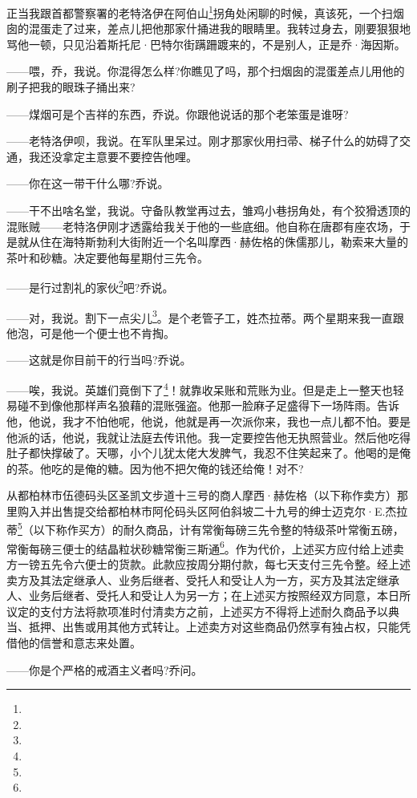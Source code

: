 \par 正当我跟首都警察署的老特洛伊在阿伯山\footnote{}拐角处闲聊的时候，真该死，一个扫烟囱的混蛋走了过来，差点儿把他那家什捅进我的眼睛里。我转过身去，刚要狠狠地骂他一顿，只见沿着斯托尼·巴特尔街蹒跚踱来的，不是别人，正是乔·海因斯。
\par ——喂，乔，我说。你混得怎么样?你瞧见了吗，那个扫烟囱的混蛋差点儿用他的刷子把我的眼珠子捅出来?
\par ——煤烟可是个吉祥的东西，乔说。你跟他说话的那个老笨蛋是谁呀?
\par ——老特洛伊呗，我说。在军队里呆过。刚才那家伙用扫帚、梯子什么的妨碍了交通，我还没拿定主意要不要控告他哩。
\par ——你在这一带干什么哪?乔说。
\par ——干不出啥名堂，我说。守备队教堂再过去，雏鸡小巷拐角处，有个狡猾透顶的混账贼——老特洛伊刚才透露给我关于他的一些底细。他自称在唐郡有座农场，于是就从住在海特斯勃利大街附近一个名叫摩西·赫佐格的侏儒那儿，勒索来大量的茶叶和砂糖。决定要他每星期付三先令。
\par ——是行过割礼的家伙\footnote{}吧?乔说。
\par ——对，我说。割下一点尖儿\footnote{}。是个老管子工，姓杰拉蒂。两个星期来我一直跟他泡，可是他一个便士也不肯掏。
\par ——这就是你目前干的行当吗?乔说。
\par ——唉，我说。英雄们竟倒下了\footnote{}！就靠收呆账和荒账为业。但是走上一整天也轻易碰不到像他那样声名狼藉的混账强盗。他那一脸麻子足盛得下一场阵雨。告诉他，他说，我才不怕他呢，他说，他就是再一次派你来，我也一点儿都不怕。要是他派的话，他说，我就让法庭去传讯他。我一定要控告他无执照营业。然后他吃得肚子都快撑破了。天哪，小个儿犹太佬大发脾气，我忍不住笑起来了。他喝的是俺的茶。他吃的是俺的糖。因为他不把欠俺的钱还给俺！对不?
\par 从都柏林市伍德码头区圣凯文步道十三号的商人摩西·赫佐格（以下称作卖方）那里购入并出售提交给都柏林市阿伦码头区阿伯斜坡二十九号的绅士迈克尔·E.杰拉蒂\footnote{}（以下称作买方）的耐久商品，计有常衡每磅三先令整的特级茶叶常衡五磅，常衡每磅三便士的结晶粒状砂糖常衡三斯通\footnote{}。作为代价，上述买方应付给上述卖方一镑五先令六便士的货款。此款应按周分期付款，每七天支付三先令整。经上述卖方及其法定继承人、业务后继者、受托人和受让人为一方，买方及其法定继承人、业务后继者、受托人和受让人为另一方；在上述买方按照经双方同意，本日所议定的支付方法将款项准时付清卖方之前，上述买方不得将上述耐久商品予以典当、抵押、出售或用其他方式转让。上述卖方对这些商品仍然享有独占权，只能凭借他的信誉和意志来处置。
\par ——你是个严格的戒酒主义者吗?乔问。
